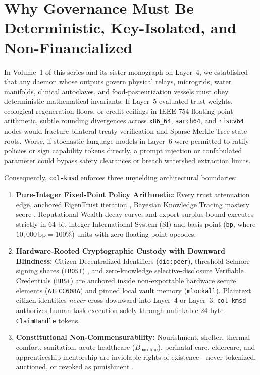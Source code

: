 \section*{Why Governance Must Be Deterministic, Key-Isolated, and Non-Financialized}

In Volume~1 of this series and its sister monograph on Layer~4, we established that any daemon
whose outputs govern physical relays, microgrids, water manifolds, clinical autoclaves, and
food-pasteurization vessels must obey deterministic mathematical invariants. If Layer~5
evaluated trust weights, ecological regeneration floors, or credit ceilings in IEEE-754
floating-point arithmetic, subtle rounding divergences across \texttt{x86\_64},
\texttt{aarch64}, and \texttt{riscv64} nodes would fracture bilateral treaty verification and
Sparse Merkle Tree state roots. Worse, if stochastic language models in Layer~6 were permitted
to ratify policies or sign capability tokens directly, a prompt injection or confabulated
parameter could bypass safety clearances or breach watershed extraction limits.

Consequently, \texttt{col-kmsd} enforces three unyielding architectural boundaries:
\begin{enumerate}
\item \textbf{Pure-Integer Fixed-Point Policy Arithmetic:} Every trust attenuation edge,
        anchored EigenTrust iteration \parencite{kamvar2003}, Bayesian Knowledge Tracing
        mastery score \parencite{corbett1995bkt}, Reputational Wealth decay curve, and export
        surplus bound executes strictly in 64-bit integer International System (SI) and
        basis-point (\texttt{bp}, where $10{,}000\,\mathrm{bp} = 100\%$) units with zero
        floating-point opcodes.
\item \textbf{Hardware-Rooted Cryptographic Custody with Downward Blindness:} Citizen
        Decentralized Identifiers (\texttt{did:peer}), threshold Schnorr signing shares
        (\texttt{FROST}) \parencite{komlo2020frost}, and zero-knowledge selective-disclosure
        Verifiable Credentials (\texttt{BBS+}) \parencite{camenisch2004signature,w3c2022vc}
        are anchored inside non-exportable hardware secure elements (\texttt{ATECC608A})
        \parencite{microchip_atecc608a} and pinned local vault memory (\texttt{mlockall}).
        Plaintext citizen identities \textit{never} cross downward into Layer~4 or Layer~3;
        \texttt{col-kmsd} authorizes human task execution solely through unlinkable 24-byte
        \texttt{ClaimHandle} tokens.
\item \textbf{Constitutional Non-Commensurability:} Nourishment, shelter, thermal comfort,
        sanitation, acute healthcare ($B_{\mathrm{baseline}}$), perinatal care, eldercare, and
        apprenticeship mentorship are inviolable rights of existence---never tokenized,
        auctioned, or revoked as punishment \parencite{raworth2017,zehr1990}.
\end{enumerate}

